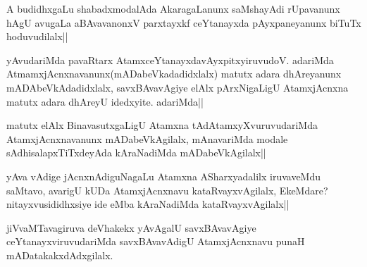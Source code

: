 
\begin{artha}
A budidhxgaLu shabadxmodalAda AkaragaLanunx saMshayAdi rUpavanunx hAgU avugaLa aBAvavanonxV parxtayxkf ceYtanayxda pAyxpaneyanunx biTuTx hoduvudilalx||
\end{artha}


\begin{artha}
yAvudariMda pavaRtarx AtamxceYtanayxdavAyxpitxyiruvudoV. adariMda AtmamxjAcnxnavanunx(mADabeVkadadidxlalx) matutx adara dhAreyanunx mADAbeVkAdadidxlalx, savxBAvavAgiye elAlx pArxNigaLigU AtamxjAcnxna matutx adara dhAreyU idedxyite. adariMda||
\end{artha}

\begin{artha}
matutx elAlx BinavasutxgaLigU Atamxna tAdAtamxyXvuruvudariMda AtamxjAcnxnavanunx mADabeVkAgilalx, mAnavariMda modale sAdhisalapxTiTxdeyAda kAraNadiMda mADabeVkAgilalx||
\end{artha}


\begin{artha}
yAva vAdige jAcnxnAdiguNagaLu Atamxna ASharxyadalilx iruvaveMdu saMtavo, avarigU kUDa AtamxjAcnxnavu kataRvayxvAgilalx, EkeMdare? nitayxvusididhxsiye ide eMba kAraNadiMda kataRvayxvAgilalx||
\end{artha}


\begin{artha}
jiVvaMTavagiruva deVhakekx yAvAgalU savxBAvavAgiye ceYtanayxviruvudariMda savxBAvavAdigU AtamxjAcnxnavu punaH mADatakakxdAdxgilalx.
\end{artha}


